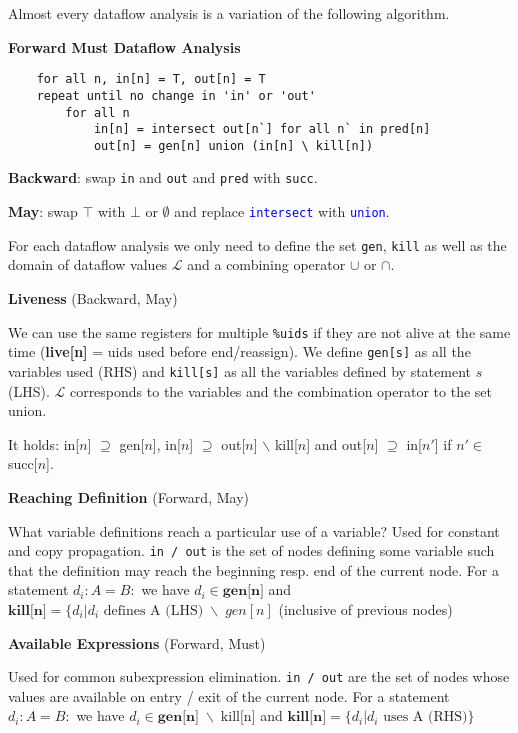 Almost every dataflow analysis is a variation of the following algorithm.\smallskip

\textbf{Forward Must Dataflow Analysis}
\begin{lstlisting}
	for all n, in[n] = T, out[n] = T
	repeat until no change in 'in' or 'out'
		for all n
			in[n] = intersect out[n`] for all n` in pred[n]
			out[n] = gen[n] union (in[n] \ kill[n])	
\end{lstlisting}
\textbf{Backward}: swap \texttt{in} and \texttt{out} and \texttt{pred} with \texttt{succ}.

\textbf{May}: swap $\top$ with $\bot$ or $\emptyset$ and replace \textcolor{blue}{\texttt{intersect}} with \textcolor{blue}{\texttt{union}}.\medskip

For each dataflow analysis we only need to define the set \texttt{gen}, \texttt{kill} as well as the domain of dataflow values $\mathcal L$ and a combining operator $\cup$ or $\cap$.\medskip

\textbf{Liveness} (Backward, May)\medskip

We can use the same registers for multiple \texttt{\%uids} if they are not alive at the same time
(\textbf{live[n]} = uids used before end/reassign).
We define \texttt{gen[s]} as all the variables used (RHS) and \texttt{kill[s]} as all the variables defined by statement $s$ (LHS). $\mathcal L$ corresponds to the variables and the combination operator to the set union.\medskip

It holds: in[$n$] $\supseteq$ gen[$n$], in[$n$] $\supseteq$ out[$n$] $\backslash$ kill[$n$] and out[$n$] $\supseteq$ in[$n'$] if $n' \in $ succ[$n$].\medskip

\textbf{Reaching Definition} (Forward, May)\medskip

What variable definitions reach a particular use of a variable? Used for constant and copy propagation.
\texttt{in / out} is the set of nodes defining some variable such that the definition may reach the beginning resp.
end of the current node. For a statement $d_i: A=B:$ we have $d_i \in \textbf{gen[n]}$ and $\textbf{kill[n]}=\{d_i | \text{$d_i$ defines A (LHS)} \;\backslash\; gen[n]$ (inclusive of previous nodes) \medskip

\textbf{Available Expressions} (Forward, Must)\medskip

Used for common subexpression elimination.
\texttt{in / out} are the set of nodes whose values are available on entry / exit of the current node.
For a statement $d_i: A=B:$ we have $d_i \in \textbf{gen[n]} \;\backslash\; \text{kill[n]}$ and $\textbf{kill[n]}=\{d_i | \text{$d_i$ uses A (RHS)}\}$\medskip

